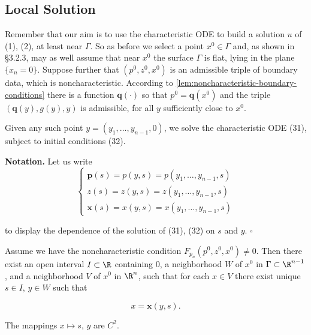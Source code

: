 \subsection{Local Solution}
\label{sec:characteristics-local-solution}

Remember that our aim is to use the characteristic ODE to build a solution $u$ of (1), (2), at least near $\Gamma$. So as before we select a point $x^0 \in \Gamma$ and, as shown in \S3.2.3, may as well assume that near $x^0$ the surface $\Gamma$ is flat, lying in the plane $\{x_n = 0\}$. Suppose further that $(p^0, z^0, x^0)$ is an admissible triple of boundary data, which is noncharacteristic. According to \cref{lem:noncharacteristic-boundary-conditions} there is a function $\mathbf{q}(\cdot)$ so that $p^0 = \mathbf{q}(x^0)$ and the triple $(\mathbf{q}(y), g(y), y)$ is admissible, for all $y$ sufficiently close to $x^0$.

Given any such point $y = (y_1, \ldots, y_{n-1}, 0)$, we solve the characteristic ODE (31), subject to initial conditions (32).

\textbf{Notation.} Let us write
$$\begin{cases}
\mathbf{p}(s) = p(y,s) = p(y_1, \ldots, y_{n-1}, s) \\
z(s) = z(y,s) = z(y_1, \ldots, y_{n-1}, s) \\
\mathbf{x}(s) = x(y,s) = x(y_1, \ldots, y_{n-1}, s)
\end{cases}$$

to display the dependence of the solution of (31), (32) on $s$ and $y$. $\square$

\begin{lemma}
\label{lem:local-invertibility-characteristics}
Assume we have the noncharacteristic condition $F_{p_n}(p^0, z^0, x^0) \neq 0$. Then there exist an open interval $I \subset \R$ containing $0$, a neighborhood $W$ of $x^0$ in $\Gamma \subset \R^{n-1}$, and a neighborhood $V$ of $x^0$ in $\R^n$, such that for each $x \in V$ there exist unique $s \in I$, $y \in W$ such that

$$x = \mathbf{x}(y, s).$$

The mappings $x \mapsto s$, $y$ are $C^2$.
\end{lemma}


